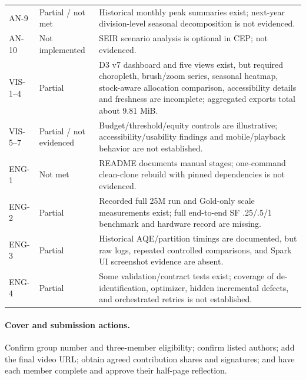 ﻿\documentclass[conference]{IEEEtran}
\begin{document}
\begin{longtable}{p{1.7cm}p{2.4cm}p{11.7cm}}
AN-9 & Partial / not met & Historical monthly peak summaries exist; next-year division-level seasonal decomposition is not evidenced. \\
AN-10 & Not implemented & SEIR scenario analysis is optional in CEP; not evidenced. \\
VIS-1--4 & Partial & D3 v7 dashboard and five views exist, but required choropleth, brush/zoom series, seasonal heatmap, stock-aware allocation comparison, accessibility details and freshness are incomplete; aggregated exports total about 9.81 MiB. \\
VIS-5--7 & Partial / not evidenced & Budget/threshold/equity controls are illustrative; accessibility/usability findings and mobile/playback behavior are not established. \\
ENG-1 & Not met & README documents manual stages; one-command clean-clone rebuild with pinned dependencies is not evidenced. \\
ENG-2 & Partial & Recorded full 25M run and Gold-only scale measurements exist; full end-to-end SF .25/.5/1 benchmark and hardware record are missing. \\
ENG-3 & Partial & Historical AQE/partition timings are documented, but raw logs, repeated controlled comparisons, and Spark UI screenshot evidence are absent. \\
ENG-4 & Partial & Some validation/contract tests exist; coverage of de-identification, optimizer, hidden incremental defects, and orchestrated retries is not established. \\
\bottomrule
\end{longtable}
\normalsize

\paragraph{Cover and submission actions.} Confirm group number and three-member eligibility; confirm listed authors; add the final video URL; obtain agreed contribution shares and signatures; and have each member complete and approve their half-page reflection.
\end{document}
